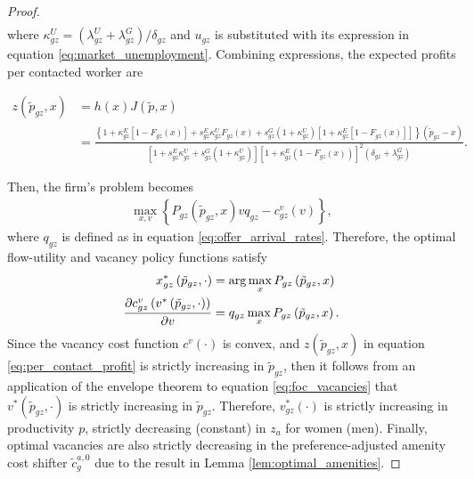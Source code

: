 \begin{proof}
\begin{align}
    \end{align}
    where $\kappa_{gz}^{U} = (\lambda_{gz}^{U} + \lambda_{gz}^{G}) / \delta_{gz}$ and $u_{gz}$ is substituted with its expression in equation \eqref{eq:market_unemployment}. Combining expressions, the expected profits per contacted worker are
    \begin{small}
        \begin{align}
            z\left(\tilde{p}_{gz},x\right)	%
            &=h\left(x\right)J\left(\tilde{p},x\right) \\
            &=\frac{\left\{ 1+\kappa_{gz}^{E}\left[1-F_{gz}\left(x\right)\right]+s_{gz}^{E}\kappa_{gz}^{U}F_{gz}\left(x\right)+s_{gz}^{G}\left(1+\kappa_{gz}^{U}\right)\left[1+\kappa_{gz}^{E}\left[1-F_{gz}\left(x\right)\right]\right]\right\} \left(\tilde{p}_{gz}-x\right)}{\left[1+s_{gz}^{E}\kappa_{gz}^{U}+s_{gz}^{G}\left(1+\kappa_{gz}^{U}\right)\right]\left[1+\kappa_{gz}^{E}\left(1-F_{gz}\left(x\right)\right)\right]^{2}\left(\delta_{gz}+\lambda_{gz}^{G}\right)}. \label{eq:per_contact_profit}
        \end{align}
    \end{small}
    Then, the firm's problem becomes
    \begin{align}
        \max_{x,v}\left\{ P_{gz}\left(\tilde{p}_{gz},x\right)vq_{gz}-c_{gz}^{v}\left(v\right)\right\},
    \end{align}
    where $q_{gz}$ is defined as in equation \eqref{eq:offer_arrival_rates}. Therefore, the optimal flow-utility and vacancy policy functions satisfy
    \begin{align}
        x_{gz}^{*}\left(\tilde{p}_{gz},\cdot\right) &= \arg\max_{x}P_{gz}\left(\tilde{p}_{gz},x\right) \notag \\
        \frac{\partial c_{gz}^{v}\left(v^{*}\left(\tilde{p}_{gz},\cdot\right)\right)}{\partial v} &= q_{gz} \max_{x} P_{gz} \left(\tilde{p}_{gz}, x\right). \label{eq:foc_vacancies}
    \end{align}
    Since the vacancy cost function $c^{v}\left(\cdot\right)$ is convex, and $z\left(\tilde{p}_{gz},x\right)$ in equation \eqref{eq:per_contact_profit} is strictly increasing in $\tilde{p}_{gz}$, then it follows from an application of the envelope theorem to equation \eqref{eq:foc_vacancies} that $v^{*}\left(\tilde{p}_{gz},\cdot\right)$ is strictly increasing in $\tilde{p}_{gz}$. Therefore, $v_{gz}^{*}(\cdot)$ is strictly increasing in productivity $p$, strictly decreasing (constant) in $z_{a}$ for women (men). Finally, optimal vacancies are also strictly decreasing in the preference-adjusted amenity cost shifter $\tilde{c}_{g}^{a,0}$ due to the result in Lemma \ref{lem:optimal_amenities}.
\end{proof}


